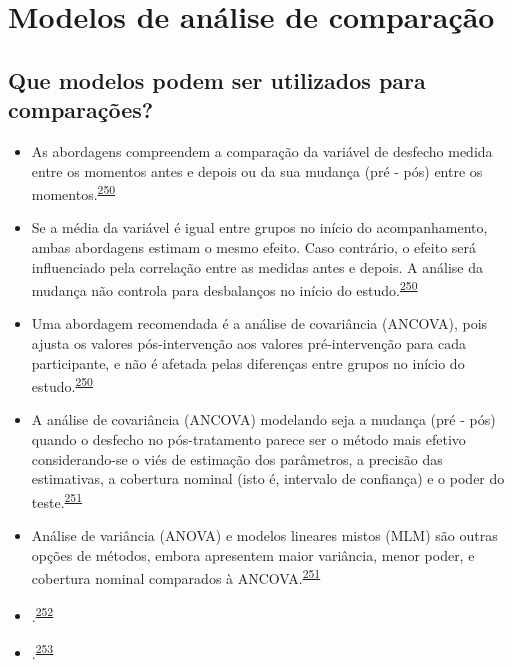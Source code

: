 \documentclass[
  a4paper,
]{book}
\begin{document}
\hypertarget{metodos-comparacao}{%
\section{Modelos de análise de comparação}\label{metodos-comparacao}}

\hypertarget{que-modelos-podem-ser-utilizados-para-comparauxe7uxf5es}{%
\subsection{Que modelos podem ser utilizados para comparações?}\label{que-modelos-podem-ser-utilizados-para-comparauxe7uxf5es}}

\begin{itemize}
\item
  As abordagens compreendem a comparação da variável de desfecho medida entre os momentos antes e depois ou da sua mudança (pré - pós) entre os momentos.\textsuperscript{\protect\hyperlink{ref-Vickers2001}{250}}
\item
  Se a média da variável é igual entre grupos no início do acompanhamento, ambas abordagens estimam o mesmo efeito. Caso contrário, o efeito será influenciado pela correlação entre as medidas antes e depois. A análise da mudança não controla para desbalanços no início do estudo.\textsuperscript{\protect\hyperlink{ref-Vickers2001}{250}}
\item
  Uma abordagem recomendada é a análise de covariância (ANCOVA), pois ajusta os valores pós-intervenção aos valores pré-intervenção para cada participante, e não é afetada pelas diferenças entre grupos no início do estudo.\textsuperscript{\protect\hyperlink{ref-Vickers2001}{250}}
\item
  A análise de covariância (ANCOVA) modelando seja a mudança (pré - pós) quando o desfecho no pós-tratamento parece ser o método mais efetivo considerando-se o viés de estimação dos parâmetros, a precisão das estimativas, a cobertura nominal (isto é, intervalo de confiança) e o poder do teste.\textsuperscript{\protect\hyperlink{ref-OConnell2017}{251}}
\item
  Análise de variância (ANOVA) e modelos lineares mistos (MLM) são outras opções de métodos, embora apresentem maior variância, menor poder, e cobertura nominal comparados à ANCOVA.\textsuperscript{\protect\hyperlink{ref-OConnell2017}{251}}
\item
  .\textsuperscript{\protect\hyperlink{ref-Cnaan1997}{252}}
\item
  .\textsuperscript{\protect\hyperlink{ref-mallinckrodt2008}{253}}
\end{itemize}
\end{document}
